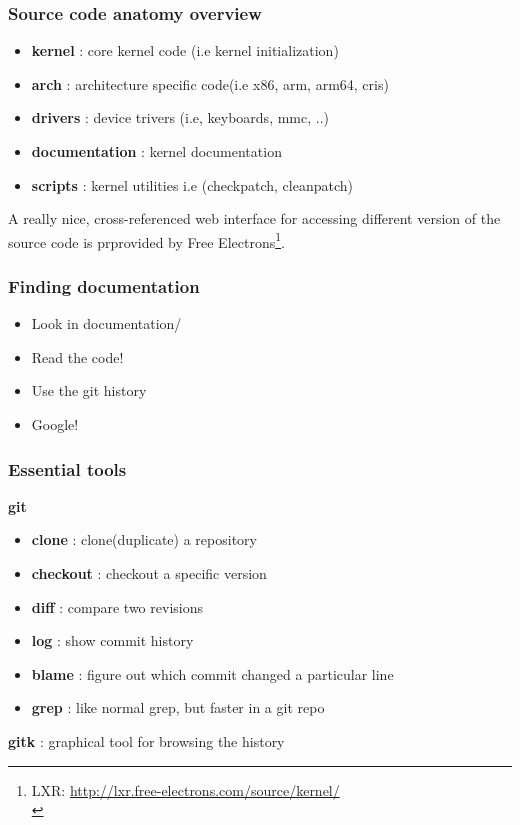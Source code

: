 \documentclass{beamer}
\begin{document}
\begin{frame}
\frametitle{Source code anatomy overview}
\begin{itemize}
	\item \textbf{kernel} : core kernel code (i.e kernel initialization) \\
	\item \textbf{arch} : architecture specific code(i.e x86, arm, arm64, cris) \\
	\item \textbf{drivers} : device trivers (i.e, keyboards, mmc, ..) \\
	\item \textbf{documentation} : kernel documentation \\
	\item \textbf{scripts} : kernel utilities i.e (checkpatch, cleanpatch) \\
\end{itemize}

A really nice, cross-referenced web interface for accessing different version of the source code is prprovided by Free Electrons\footnote{LXR: \url{http://lxr.free-electrons.com/source/kernel/}\\}.
\end{frame}

\begin{frame}
\frametitle{Finding documentation}
\begin{itemize}
	\item Look in documentation/
	\item Read the code!
	\item Use the git history
	\item Google!
\end{itemize}
\end{frame}

\begin{frame}
\frametitle{Essential tools}
\textbf{git}
\begin{itemize}
	\item \textbf{clone} : clone(duplicate) a repository \\
	\item \textbf{checkout} : checkout a specific version\\
	\item \textbf{diff} : compare two revisions\\
	\item \textbf{log} : show commit history\\
	\item \textbf{blame} : figure out which commit changed a particular line\\
	\item \textbf{grep} : like normal grep, but faster in a git repo \\ 
\end{itemize}
\textbf{gitk} : graphical tool for browsing the history
\end{frame}
\end{document}
